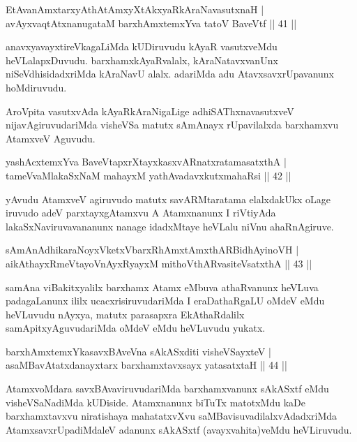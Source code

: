 \begin{shl}
EtAvanAmxtarxyAthAtAmxyXtAkxyaRkAraNavasutxnaH |\\
avAyxvaqtAtxnanugataM barxhAmx\s \s temxYva tatoV BaveVtf \hfill || 41 ||
\end{shl}

\begin{artha}
anavxyavayxtireVkagaLiMda kUDiruvudu kAyaR vasutxveMdu heVLalapxDuvudu. barxhamxkAyaRvalalx, kAraNatavxvanUnx niSeVdhisidadxriMda kAraNavU alalx. adariMda adu AtavxsavxrUpavanunx hoMdiruvudu.

AroVpita vasutxvAda kAyaRkAraNigaLige adhiSAThxnavasutxveV nijavAgiruvudariMda visheVSa matutx sAmAnayx rUpavilalxda barxhamxvu AtamxveV Aguvudu.
\end{artha}%


\begin{shl}
yashAcx\s \s temxYva BaveVtapxrXtayxkasxvARnatxratamasatxthA |\\
tameVvaMlakaSxNaM mahayxM yathAvadavxkutxmahaRsi \hfill || 42 ||
\end{shl}

\begin{artha}
yAvudu AtamxveV agiruvudo matutx savARMtaratama elalxdakUkx oLage iruvudo adeV parxtayxgAtamxvu A Atamxnanunx I riVtiyAda lakaSxNaviruvavananunx nanage idadxMtaye heVLalu niVnu ahaRnAgiruve.
\end{artha}

\begin{shl}
sAmAnAdhikaraNoyxVketxVbarxRhAmxtAmxthARBidhAyinoVH |\\
aikAthayxRmeVtayoVnAyxRyayxM mithoVthARvasiteVsatxthA \hfill || 43 ||
\end{shl}

\begin{artha}
samAna viBakitxyalilx barxhamx Atamx eMbuva athaRvanunx heVLuva padagaLanunx ililx ucacxrisiruvudariMda I eraDathaRgaLU oMdeV eMdu heVLuvudu nAyxya, matutx parasapxra EkAthaRdalilx samApitxyAguvudariMda oMdeV eMdu heVLuvudu yukatx.
\end{artha}

\begin{shl}
barxhAmx\s \s temxYkasavxBAveVna sAkASxditi visheVSayxteV |\\
asaMBavAtatxdanayxtarx barxhamxtavxsayx yatasatxtaH \hfill || 44 ||
\end{shl}

\begin{artha}%
AtamxvoMdara savxBAvaviruvudariMda barxhamxvanunx sAkASxtf eMdu visheVSaNadiMda kUDiside. Atamxnanunx biTuTx matotxMdu kaDe barxhamxtavxvu niratishaya mahatatxvXvu  saMBavisuvadilalxvAdadxriMda AtamxsavxrUpadiMdaleV adanunx sAkASxtf (avayxvahita)veMdu heVLiruvudu.
\end{artha}

